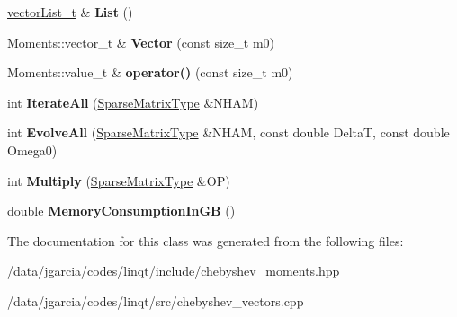 \begin{DoxyCompactItemize}
\item 
\hyperlink{class_vector_list}{vector\+List\+\_\+t} \& {\bfseries List} ()\hypertarget{classchebyshev_1_1_vectors_adf7b1351546490cbf11619cbaa49ffb6}{}\label{classchebyshev_1_1_vectors_adf7b1351546490cbf11619cbaa49ffb6}

\item 
Moments\+::vector\+\_\+t \& {\bfseries Vector} (const size\+\_\+t m0)\hypertarget{classchebyshev_1_1_vectors_ad7fb30e4b0200f4c3bc4e6f9528c1139}{}\label{classchebyshev_1_1_vectors_ad7fb30e4b0200f4c3bc4e6f9528c1139}

\item 
Moments\+::value\+\_\+t \& {\bfseries operator()} (const size\+\_\+t m0)\hypertarget{classchebyshev_1_1_vectors_a017a8ee693aa4d9f206a541872d2d117}{}\label{classchebyshev_1_1_vectors_a017a8ee693aa4d9f206a541872d2d117}

\item 
int {\bfseries Iterate\+All} (\hyperlink{class_sparse_matrix_type}{Sparse\+Matrix\+Type} \&N\+H\+AM)\hypertarget{classchebyshev_1_1_vectors_a189bb070d0310aa8dede2721c2df189f}{}\label{classchebyshev_1_1_vectors_a189bb070d0310aa8dede2721c2df189f}

\item 
int {\bfseries Evolve\+All} (\hyperlink{class_sparse_matrix_type}{Sparse\+Matrix\+Type} \&N\+H\+AM, const double DeltaT, const double Omega0)\hypertarget{classchebyshev_1_1_vectors_aec0080410aaab617e2a491be414824c0}{}\label{classchebyshev_1_1_vectors_aec0080410aaab617e2a491be414824c0}

\item 
int {\bfseries Multiply} (\hyperlink{class_sparse_matrix_type}{Sparse\+Matrix\+Type} \&OP)\hypertarget{classchebyshev_1_1_vectors_a006a4bbef4757065613daf41d6d22bee}{}\label{classchebyshev_1_1_vectors_a006a4bbef4757065613daf41d6d22bee}

\item 
double {\bfseries Memory\+Consumption\+In\+GB} ()\hypertarget{classchebyshev_1_1_vectors_a843740c964a4e430a5e832fac8e6dc9d}{}\label{classchebyshev_1_1_vectors_a843740c964a4e430a5e832fac8e6dc9d}

\end{DoxyCompactItemize}


The documentation for this class was generated from the following files\+:\begin{DoxyCompactItemize}
\item 
/data/jgarcia/codes/linqt/include/chebyshev\+\_\+moments.\+hpp\item 
/data/jgarcia/codes/linqt/src/chebyshev\+\_\+vectors.\+cpp\end{DoxyCompactItemize}
